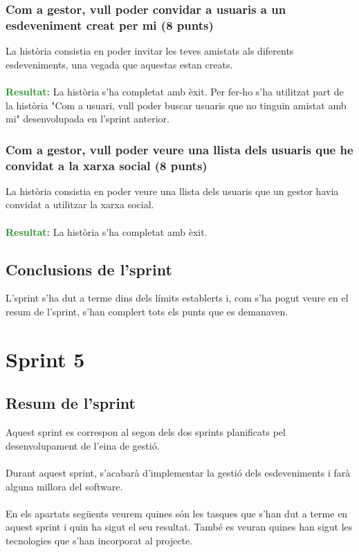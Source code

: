 \documentclass[11pt,catalan,listoffigures,listoftables]{tfgetsinf}
\begin{document}
\subsubsection{Com a gestor, vull poder convidar a usuaris a un esdeveniment creat per mi (8 punts)}

La història consistia en poder invitar les teves amistats als diferents esdeveniments, una vegada que aquestas estan creats.\\ \\
\textcolor{forestgreen}{\textbf{Resultat:}} La història s'ha completat amb èxit. Per fer-ho s'ha utilitzat part de la història "Com a usuari, vull poder buscar usuaris que no tinguin amistat amb mi" desenvolupada en l'sprint anterior.

\subsubsection{Com a gestor, vull poder veure una llista dels usuaris que he convidat a la xarxa social (8 punts)}

La història consistia en poder veure una llista dels usuaris que un gestor havia convidat a utilitzar la xarxa social.\\ \\
\textcolor{forestgreen}{\textbf{Resultat:}} La història s'ha completat amb èxit.

\subsection{Conclusions de l'sprint}

L'sprint s'ha dut a terme dins dels límits establerts i, com s'ha pogut veure en el resum de l'sprint, s'han complert tots els punts que es demanaven.

\section{Sprint 5}

\subsection{Resum de l'sprint}

Aquest sprint es correspon al segon dels dos sprints planificats pel desenvolupament de l'eina de gestió.\\ \\
Durant aquest sprint, s'acabarà d'implementar la gestió dels esdeveniments i farà alguna millora del software.\\ \\
En els apartats següents veurem quines són les tasques que s'han dut a terme en aquest sprint i quin ha sigut el seu resultat. També es veuran quines han sigut les tecnologies que s'han incorporat al projecte.
\end{document}
